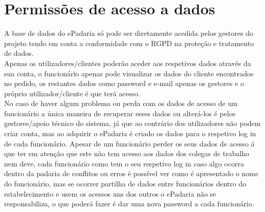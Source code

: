 \section{Permissões de acesso a dados}
A base de dados do ePadaria só pode ser diretamente acedida pelos gestores do projeto tendo em conta a conformidade com o RGPD na proteção e tratamento de dados.\\
Apenas os utilizadores/clientes poderão aceder aos respetivos dados através da sua conta, o funcionário apenas pode visualizar os dados do cliente encontrados no pedido, os restantes dados como password e e-mail apenas os gestores e o próprio utilizador/cliente é que terá acesso.\\
No caso de haver algum problema ou perda com os dados de acesso de um funcionário a única maneira de recuperar esses dados ou alterá-los é pelos gestores/apoio técnico do sistema, já que ao contrário dos utilizadores não podem criar conta, mas ao adquirir o ePadaria é criado os dados para o respetivo log in de cada funcionário. Apesar de um funcionário perder os seus dados de acesso á que ter em atenção que este não tem acesso aos dados dos colegas de trabalho nem deve, cada funcionário como tem o seu respetivo log in caso algo ocorra dentro da padaria de conflitos ou erros é possível ver como é apresentado o nome do funcionário, mas se ocorrer partilha de dados entre funcionários dentro do estabelecimento e usem os acessos uns dos outros o ePadaria não se responsabiliza, o que poderá fazer é dar uma nova password a cada funcionário.

